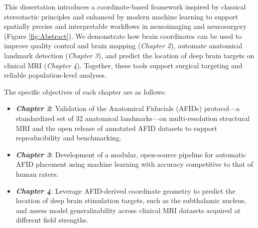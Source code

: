 This dissertation introduces a coordinate-based framework inspired by classical stereotactic principles and enhanced by modern machine learning to support spatially precise and interpretable workflows in neuroimaging and neurosurgery (Figure \ref{fig:Abstract}). We demonstrate how brain coordinates can be used to improve quality control and brain mapping (\textit{Chapter 2}), automate anatomical landmark detection (\textit{Chapter 3}), and predict the location of deep brain targets on clinical MRI (\textit{Chapter 4}). Together, these tools support surgical targeting and reliable population-level analyses. 

The specific objectives of each chapter are as follows:
\begin{itemize}
\item \textbf{\textit{Chapter 2}}: Validation of the Anatomical Fiducials (AFIDs) protocol—a standardized set of 32 anatomical landmarks—on multi-resolution structural MRI and the open release of annotated AFID datasets to support reproducibility and benchmarking.
\item \textbf{\textit{Chapter 3}}: Development of a modular, open-source pipeline for automatic AFID placement using machine learning with accuracy competitive to that of human raters.
\item \textbf{\textit{Chapter 4}}: Leverage AFID-derived coordinate geometry to predict the location of deep brain stimulation targets, such as the subthalamic nucleus, and assess model generalizability across clinical MRI datasets acquired at different field strengths.
\end{itemize}